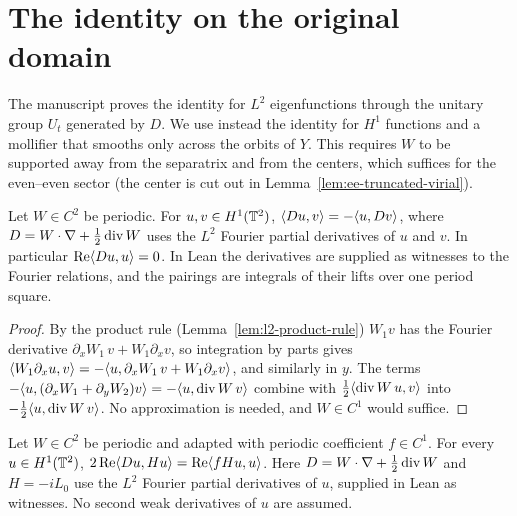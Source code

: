 \section{The identity on the original domain}

The manuscript proves the identity for $L^2$ eigenfunctions through the unitary group
$U_t$ generated by $D$. We use instead the identity for $H^1$ functions and a mollifier
that smooths only across the orbits of $Y$. This requires $W$ to be supported away from the
separatrix and from the centers, which suffices for the even--even sector (the center is
cut out in Lemma~\ref{lem:ee-truncated-virial}).

\begin{lemma}
\label{lem:half-density-skew-h1}
\leanok
Let $W\in C^2$ be periodic. For $u,v\in H^1(\mathbb{T}^2)$, $\langle Du,v\rangle=-\langle u,Dv\rangle$, where
$D=W\cdot\nabla+\tfrac12\operatorname{div} W$ uses the $L^2$ Fourier partial derivatives of $u$ and
$v$. In particular $\operatorname{Re}\langle Du,u\rangle=0$. In Lean the derivatives are supplied
as witnesses to the Fourier relations, and the pairings are integrals of their lifts
over one period square.
\end{lemma}

\begin{proof}
\leanok
By the product rule (Lemma~\ref{lem:l2-product-rule}) $W_1v$ has the Fourier derivative
$\partial_xW_1\,v+W_1\partial_xv$, so integration by parts gives
$\langle W_1\partial_xu,v\rangle=-\langle u,\partial_xW_1\,v+W_1\partial_xv\rangle$, and similarly in $y$.
The terms $-\langle u,(\partial_xW_1+\partial_yW_2)v\rangle=-\langle u,\operatorname{div} W\,v\rangle$ combine with
$\tfrac12\langle \operatorname{div} W\,u,v\rangle$ into $-\tfrac12\langle u,\operatorname{div} W\,v\rangle$. No approximation is
needed, and $W\in C^1$ would suffice.
\end{proof}

\begin{lemma}
\label{lem:virial-h1}
\leanok
Let $W\in C^2$ be periodic and adapted with periodic coefficient $f\in C^1$. For every
$u\in H^1(\mathbb{T}^2)$, $2\operatorname{Re}\langle Du,Hu\rangle=\operatorname{Re}\langle fHu,u\rangle$.
Here $D=W\cdot\nabla+\tfrac12\operatorname{div} W$ and $H=-iL_0$ use the $L^2$
Fourier partial derivatives of $u$, supplied in Lean as witnesses. No second weak
derivatives of $u$ are assumed.
\end{lemma}

